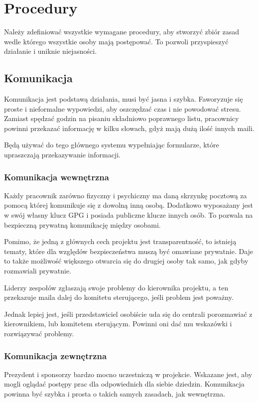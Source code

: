 \section{Procedury}
Należy zdefiniować wszystkie wymagane procedury, aby stworzyć zbiór zasad wedle którego wszystkie osoby mają postępować.
To pozwoli przyspieszyć działanie i uniknie niejasności.
\subsection{Komunikacja}
Komunikacja jest podstawą działania, musi być jasna i szybka. Faworyzuje się proste i nieformalne wypowiedzi, aby oszczędzać czas i nie powodować stresu.
Zamiast spędzać godzin na pisaniu składniowo poprawnego listu, pracownicy powinni przekazać informację w kilku słowach, gdyż mają dużą ilość innych maili.

Będą używać do tego głównego systemu wypełniając formularze, które upraszczają przekazywanie informacji.
\subsubsection{Komunikacja wewnętrzna}
Każdy pracownik zarówno fizyczny i psychiczny ma daną skrzynkę pocztową za pomocą której komunikuje się z dowolną inną osobą.
Dodatkowo wyposażany jest w swój własny klucz GPG i posiada publiczne klucze innych osób.
To pozwala na bezpieczną prywatną komunikację między osobami.

Pomimo, że jedną z głównych cech projektu jest transparentność, to istnieją tematy, które dla względów bezpieczeństwa muszą być omawiane prywatnie.
Daje to także możliwość większego otwarcia się do drugiej osoby tak samo, jak gdyby rozmawiali prywatnie.

Liderzy zespołów zgłaszają swoje problemy do kierownika projektu, a ten przekazuje maila dalej do komitetu sterującego, jeśli problem jest poważny.

Jednak lepiej jest, jeśli przedstawiciel osobiście uda się do centrali porozmawiać z kierownikiem, lub komitetem sterującym.
Powinni oni dać mu wskazówki i rozwiązywać problemy.

\subsubsection{Komunikacja zewnętrzna}
Prezydent i sponsorzy bardzo mocno uczestniczą w projekcie. Wskazane jest, aby mogli oglądać postępy prac dla odpowiednich dla siebie dziedzin.
Komunikacja powinna być szybka i prosta o takich samych zasadach, jak wewnętrzna.

